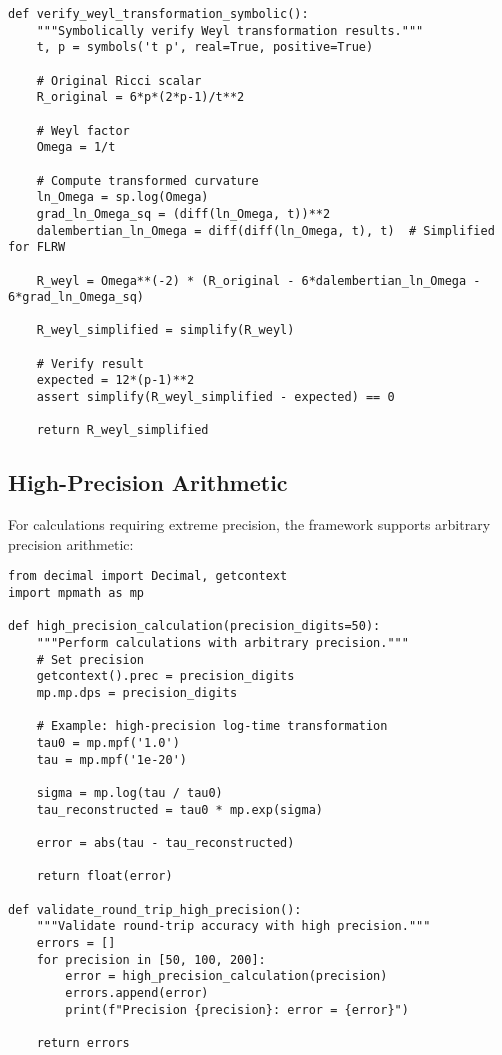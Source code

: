 \begin{verbatim}
def verify_weyl_transformation_symbolic():
    """Symbolically verify Weyl transformation results."""
    t, p = symbols('t p', real=True, positive=True)
    
    # Original Ricci scalar
    R_original = 6*p*(2*p-1)/t**2
    
    # Weyl factor
    Omega = 1/t
    
    # Compute transformed curvature
    ln_Omega = sp.log(Omega)
    grad_ln_Omega_sq = (diff(ln_Omega, t))**2
    dalembertian_ln_Omega = diff(diff(ln_Omega, t), t)  # Simplified for FLRW
    
    R_weyl = Omega**(-2) * (R_original - 6*dalembertian_ln_Omega - 6*grad_ln_Omega_sq)
    
    R_weyl_simplified = simplify(R_weyl)
    
    # Verify result
    expected = 12*(p-1)**2
    assert simplify(R_weyl_simplified - expected) == 0
    
    return R_weyl_simplified
\end{verbatim}

\subsection{High-Precision Arithmetic}
\label{app:high_precision}

For calculations requiring extreme precision, the framework supports arbitrary precision arithmetic:

\begin{verbatim}
from decimal import Decimal, getcontext
import mpmath as mp

def high_precision_calculation(precision_digits=50):
    """Perform calculations with arbitrary precision."""
    # Set precision
    getcontext().prec = precision_digits
    mp.mp.dps = precision_digits
    
    # Example: high-precision log-time transformation
    tau0 = mp.mpf('1.0')
    tau = mp.mpf('1e-20')
    
    sigma = mp.log(tau / tau0)
    tau_reconstructed = tau0 * mp.exp(sigma)
    
    error = abs(tau - tau_reconstructed)
    
    return float(error)

def validate_round_trip_high_precision():
    """Validate round-trip accuracy with high precision."""
    errors = []
    for precision in [50, 100, 200]:
        error = high_precision_calculation(precision)
        errors.append(error)
        print(f"Precision {precision}: error = {error}")
    
    return errors
\end{verbatim}

